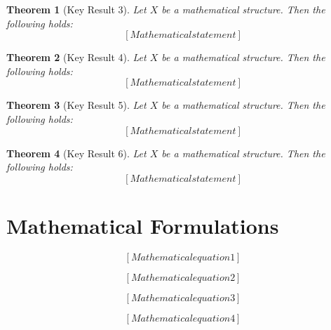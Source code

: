 \documentclass[12pt]{article}
\newtheorem{theorem}{Theorem}
\begin{document}
\begin{theorem}[Key Result 3]
Let $X$ be a mathematical structure. Then the following holds:
\begin{equation}
\label{eq:theorem_3}
[Mathematical statement]
\end{equation}
\end{theorem}

\begin{theorem}[Key Result 4]
Let $X$ be a mathematical structure. Then the following holds:
\begin{equation}
\label{eq:theorem_4}
[Mathematical statement]
\end{equation}
\end{theorem}

\begin{theorem}[Key Result 5]
Let $X$ be a mathematical structure. Then the following holds:
\begin{equation}
\label{eq:theorem_5}
[Mathematical statement]
\end{equation}
\end{theorem}

\begin{theorem}[Key Result 6]
Let $X$ be a mathematical structure. Then the following holds:
\begin{equation}
\label{eq:theorem_6}
[Mathematical statement]
\end{equation}
\end{theorem}



\section{Mathematical Formulations}

\begin{equation}
\label{eq:form_1}
[Mathematical equation 1]
\end{equation}

\begin{equation}
\label{eq:form_2}
[Mathematical equation 2]
\end{equation}

\begin{equation}
\label{eq:form_3}
[Mathematical equation 3]
\end{equation}

\begin{equation}
\label{eq:form_4}
[Mathematical equation 4]
\end{equation}
\end{document}
